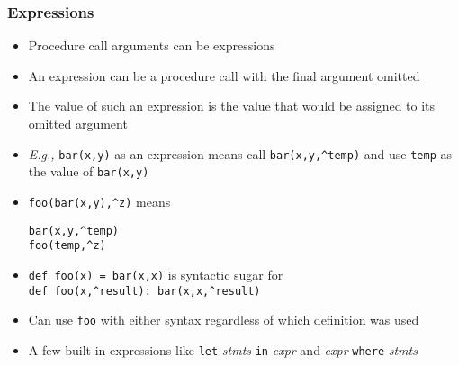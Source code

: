 \documentclass[12pt]{beamer}
\begin{document}
\begin{frame}[fragile]
\frametitle{Expressions}
\begin{itemize}
\item Procedure call arguments can be expressions
\item An expression can be a procedure call with the final argument omitted
\item The value of such an expression is the value that would be assigned
  to its omitted argument
\item \emph{E.g.,} \texttt{bar(x,y)} as an expression means call
  \texttt{bar(x,y,\^{ }temp)} and use \texttt{temp} as the value of
  \texttt{bar(x,y)}
\item \texttt{foo(bar(x,y),\^{ }z)} \quad means \quad
  \begin{minipage}[c]{0.4\linewidth}
  \texttt{bar(x,y,\^{ }temp)} \\
  \texttt{foo(temp,\^{ }z)}
  \end{minipage}
\item \texttt{def foo(x) = bar(x,x)} is syntactic sugar for \\
\texttt{def foo(x,\^{ }result): bar(x,x,\^{ }result)}
\item Can use \texttt{foo} with either syntax regardless of which
  definition was used
\item A few built-in expressions like \texttt{let} \emph{stmts}
  \texttt{in} \emph{expr} and \emph{expr} \texttt{where} \emph{stmts}
\end{itemize}
\end{frame}
\end{document}
